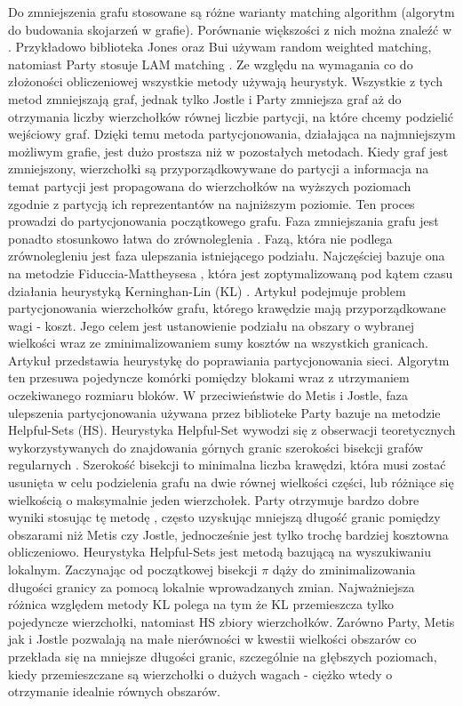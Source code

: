 Do zmniejszenia grafu stosowane są różne warianty matching algorithm (algorytm do budowania skojarzeń w grafie).
Porównanie większości z nich można znaleźć w \cite{Analysis}.
Przykładowo biblioteka Jones oraz Bui \cite{Bui1993AHF} używam random weighted matching, natomiast Party \cite{1364754}
stosuje LAM matching \cite{weighted_maching}.
Ze względu na wymagania co do złożoności obliczeniowej wszystkie metody używają heurystyk.
Wszystkie z tych metod zmniejszają graf, jednak tylko Jostle i Party zmniejsza graf
aż do otrzymania liczby wierzchołków równej liczbie partycji, na które chcemy podzielić wejściowy graf.
Dzięki temu metoda partycjonowania, działająca na najmniejszym możliwym grafie, jest dużo prostsza niż w pozostałych metodach.
Kiedy graf jest zmniejszony, wierzchołki są przyporządkowywane do partycji a informacja na temat partycji jest propagowana
do wierzchołków na wyższych poziomach zgodnie z partycją ich reprezentantów na najniższym poziomie. Ten proces prowadzi
do partycjonowania początkowego grafu. Faza zmniejszania grafu jest ponadto stosunkowo łatwa do zrównoleglenia \cite{KARYPIS199871}.
Fazą, która nie podlega zrównolegleniu jest faza ulepszania istniejącego podziału.
Najczęściej bazuje ona na metodzie Fiduccia-Mattheysesa \cite{10.5555/800263.809204},
która jest zoptymalizowaną pod kątem czasu działania heurystyką Kerninghan-Lin (KL) \cite{6771089}.
Artykuł \cite{6771089} podejmuje problem partycjonowania wierzchołków grafu, którego krawędzie mają
przyporządkowane wagi - koszt. Jego celem jest ustanowienie podziału na obszary o wybranej wielkości wraz
ze zminimalizowaniem sumy kosztów na wszystkich granicach.
Artykuł \cite{10.5555/800263.809204} przedstawia heurystykę do poprawiania partycjonowania sieci. Algorytm ten przesuwa
pojedyncze komórki pomiędzy blokami wraz z utrzymaniem oczekiwanego rozmiaru bloków.
W przeciwieństwie do Metis i Jostle, faza ulepszenia partycjonowania używana przez biblioteke Party bazuje na metodzie
Helpful-Sets (HS). Heurystyka Helpful-Set wywodzi się z obserwacji teoretycznych wykorzystywanych do znajdowania górnych
granic szerokości bisekcji grafów regularnych \cite{10.1007/3-540-54345-7_64, MONIEN2006475}.
Szerokość bisekcji to minimalna liczba krawędzi, która musi zostać usunięta w celu podzielenia grafu na
dwie równej wielkości części, lub różniące się wielkością o maksymalnie jeden wierzchołek.
Party otrzymuje bardzo dobre wyniki stosując tę metodę \cite{10.1007/3-540-44842-X_6}, często uzyskując mniejszą długość
granic pomiędzy obszarami niż Metis czy Jostle, jednocześnie jest tylko trochę bardziej kosztowna obliczeniowo.
Heurystyka Helpful-Sets jest metodą bazującą na wyszukiwaniu lokalnym. Zaczynając od początkowej bisekcji \(\pi\) dąży
do zminimalizowania długości granicy za pomocą lokalnie wprowadzanych zmian. Najważniejsza różnica względem metody KL
polega na tym że KL przemieszcza tylko pojedyncze wierzchołki, natomiast HS zbiory wierzchołków. Zarówno Party, Metis
jak i Jostle pozwalają na małe nierówności w kwestii wielkości obszarów co przekłada się na mniejsze długości granic,
szczególnie na głębszych poziomach, kiedy przemieszczane są wierzchołki o dużych wagach - ciężko wtedy o otrzymanie
idealnie równych obszarów.

